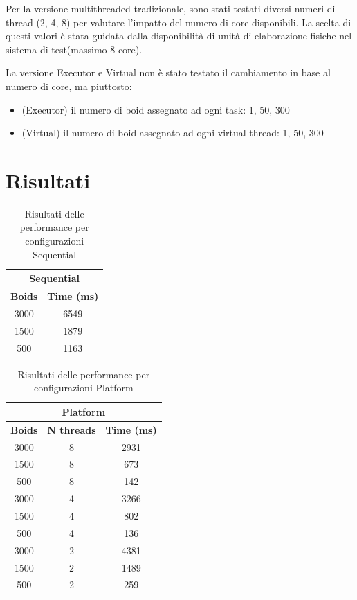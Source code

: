 \documentclass[a4paper,12pt]{report}
\begin{document}
Per la versione multithreaded tradizionale, sono stati testati diversi numeri di thread (2, 4, 8) per valutare l'impatto del numero di core disponibili. La scelta di questi valori è stata guidata dalla disponibilità di unità di elaborazione fisiche nel sistema di test(massimo 8 core).

La versione Executor e Virtual non è stato testato il cambiamento in base al numero di core, ma piuttosto:
\begin{itemize}
    \item (Executor) il numero di boid assegnato ad ogni task: 1, 50, 300
    \item (Virtual) il numero di boid assegnato ad ogni virtual thread: 1, 50, 300
\end{itemize}

\section{Risultati}

\begin{table}[h!]
    \centering
    \begin{tabular}{|c|c|}
    \hline
    \multicolumn{2}{|c|}{\textbf{Sequential}} \\
    \hline
    \textbf{Boids}& \textbf{Time (ms)}\\
    \hline
    3000 & 6549 \\
    1500 & 1879  \\
    500  & 1163  \\
    \hline
    \end{tabular}
    \caption{Risultati delle performance per configurazioni Sequential}
    \label{tab:sequential-performance}
\end{table}

\begin{table}[h!]
    \centering
    \begin{tabular}{|c|c|c|}
    \hline
    \multicolumn{3}{|c|}{\textbf{Platform}} \\
    \hline
    \textbf{Boids} & \textbf{N threads} & \textbf{Time (ms)}\\
    \hline
    3000 & 8 & 2931 \\
    1500 & 8 & 673  \\
    500  & 8 & 142  \\
    \hline
    \hline
    3000 & 4 & 3266 \\
    1500 & 4 & 802  \\
    500  & 4 & 136  \\
    \hline
    \hline
    3000 & 2 & 4381 \\
    1500 & 2 & 1489  \\
    500  & 2 & 259  \\
    \hline
    \end{tabular}
    \caption{Risultati delle performance per configurazioni Platform}
    \label{tab:platform-performance}
\end{table}
\end{document}
